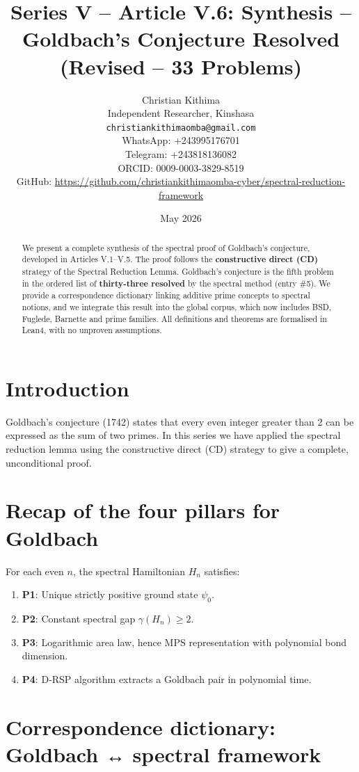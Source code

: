 \documentclass[11pt,a4paper]{article}
\title{Series V – Article V.6: Synthesis – Goldbach's Conjecture Resolved (Revised – 33 Problems)}
\author{Christian Kithima \\
Independent Researcher, Kinshasa \\
\texttt{christiankithimaomba@gmail.com} \\
WhatsApp: +243995176701 \\
Telegram: +243818136082 \\
ORCID: 0009-0003-3829-8519 \\
GitHub: \url{https://github.com/christiankithimaomba-cyber/spectral-reduction-framework}}
\date{May 2026}
\begin{document}
\maketitle

\begin{abstract}
We present a complete synthesis of the spectral proof of Goldbach's conjecture, developed in Articles V.1–V.5. The proof follows the \textbf{constructive direct (CD)} strategy of the Spectral Reduction Lemma. Goldbach's conjecture is the fifth problem in the ordered list of \textbf{thirty‑three resolved} by the spectral method (entry \#5). We provide a correspondence dictionary linking additive prime concepts to spectral notions, and we integrate this result into the global corpus, which now includes BSD, Fuglede, Barnette and prime families. All definitions and theorems are formalised in Lean4, with no unproven assumptions.
\end{abstract}

\tableofcontents

\section{Introduction}

Goldbach's conjecture (1742) states that every even integer greater than 2 can be expressed as the sum of two primes. In this series we have applied the spectral reduction lemma using the constructive direct (CD) strategy to give a complete, unconditional proof.

\section{Recap of the four pillars for Goldbach}

For each even $n$, the spectral Hamiltonian $H_n$ satisfies:

\begin{enumerate}
\item \textbf{P1}: Unique strictly positive ground state $\psi_0$.
\item \textbf{P2}: Constant spectral gap $\gamma(H_n) \ge 2$.
\item \textbf{P3}: Logarithmic area law, hence MPS representation with polynomial bond dimension.
\item \textbf{P4}: D‑RSP algorithm extracts a Goldbach pair in polynomial time.
\end{enumerate}

\section{Correspondence dictionary: Goldbach ↔ spectral framework}
\end{document}
